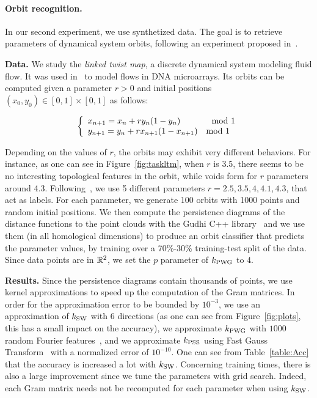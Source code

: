 \paragraph*{Orbit recognition.}
In our second experiment, we use synthetized data.
The goal is to retrieve parameters of dynamical system orbits,
following an experiment proposed in~\cite{Adams17}.

{\bf Data.} We study the {\em linked twist map}, a discrete dynamical system modeling
fluid flow. It was used in~\cite{Hertzsch07} to model flows in DNA microarrays.
Its orbits can be computed given a parameter $r>0$ and
initial positions $(x_0,y_0)\in[0,1]\times[0,1]$ as follows:

\[\left\{\begin{array}{l} x_{n+1} = x_n + ry_n(1-y_n)\ \ \ \ \ \ \ \ \ \ \ {\rm mod}\ 1 \\ y_{n+1} = y_n + rx_{n+1}(1-x_{n+1})\ \ \ {\rm mod}\ 1 \end{array}\right.\]

Depending on the values of $r$, the orbits may exhibit very different behaviors. For instance,
as one can see in Figure~\ref{fig:taskltm}, when $r$ is 3.5, there seems to be no interesting topological features
in the orbit, while voids form for $r$ parameters around 4.3.
Following~\cite{Adams17}, we use 5 different parameters $r=2.5,3.5,4,4.1,4.3$, that act as labels.
For each parameter, we generate 100 orbits with 1000 points and random initial positions. We then compute
the persistence diagrams of the distance functions to the point clouds with the Gudhi C++ library~\cite{gudhi:PersistentCohomology} and we use them (in all homological dimensions) 
to produce an orbit classifier
that predicts the parameter values, by training over a 70\%-30\% training-test split of the data.
Since data points are in $\mathbb{R}^2$, we set the $p$ parameter of $k_{\rm PWG}$ to $4$.

{\bf Results.} Since the persistence diagrams contain thousands of points, we use kernel approximations
to speed up the computation of the Gram matrices.
In order for the approximation error to be bounded by $10^{-3}$, 
we use an approximation of $k_{\rm SW}$ with $6$ directions (as one can see from Figure~\ref{fig:plots}, 
this has a small impact on the accuracy), we approximate $k_{\rm PWG}$ with $1000$ random Fourier features~\cite{Rahimi08},
and we approximate $k_{\rm PSS}$ using Fast Gauss Transform~\cite{Morariu09}
with a normalized error of $10^{-10}$. 
One can see from Table~\ref{table:Acc} that the accuracy is increased a lot with $k_{\rm SW}$.
Concerning training times, there is also a large improvement since we tune the parameters with grid search. 
Indeed, each Gram matrix needs not be recomputed for each parameter when using $k_{\rm SW}$.

